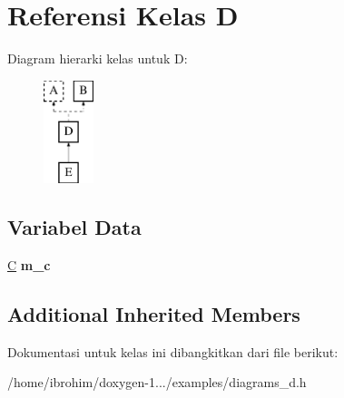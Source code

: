 \hypertarget{classD}{}\section{Referensi Kelas D}
\label{classD}
Diagram hierarki kelas untuk D\+:\begin{figure}[H]
\begin{center}
\leavevmode
\includegraphics[height=3.000000cm]{de/d26/classD}
\end{center}
\end{figure}
\subsection*{Variabel Data}
\begin{DoxyCompactItemize}
\item 
\hypertarget{classD_a9d877c7aa092f423f2a073f3c62fef9c}{}\hyperlink{classC}{C} {\bfseries m\+\_\+c}\label{classD_a9d877c7aa092f423f2a073f3c62fef9c}

\end{DoxyCompactItemize}
\subsection*{Additional Inherited Members}


Dokumentasi untuk kelas ini dibangkitkan dari file berikut\+:\begin{DoxyCompactItemize}
\item 
/home/ibrohim/doxygen-\/1.../examples/diagrams\+\_\+d.\+h\end{DoxyCompactItemize}
